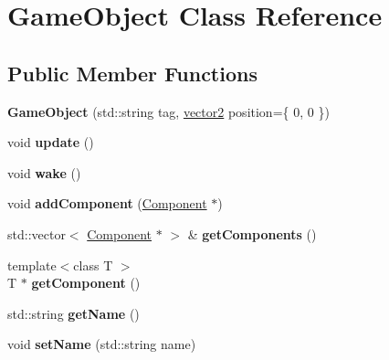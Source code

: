 \hypertarget{class_game_object}{}\section{Game\+Object Class Reference}
\label{class_game_object}
\subsection*{Public Member Functions}
\begin{DoxyCompactItemize}
\item 
\hypertarget{class_game_object_adbdcffa0cd72ae987c033e61f6b12880}{}\label{class_game_object_adbdcffa0cd72ae987c033e61f6b12880} 
{\bfseries Game\+Object} (std\+::string tag, \hyperlink{structvector2}{vector2} position=\{ 0, 0 \})
\item 
\hypertarget{class_game_object_adad7d284b670db722a2fda8e6a7997e3}{}\label{class_game_object_adad7d284b670db722a2fda8e6a7997e3} 
void {\bfseries update} ()
\item 
\hypertarget{class_game_object_ac59b76cad79c58e3ac0d4f40c4f1d4b2}{}\label{class_game_object_ac59b76cad79c58e3ac0d4f40c4f1d4b2} 
void {\bfseries wake} ()
\item 
\hypertarget{class_game_object_a0d68cf2723dd5cedc12579c08c97df04}{}\label{class_game_object_a0d68cf2723dd5cedc12579c08c97df04} 
void {\bfseries add\+Component} (\hyperlink{class_component}{Component} $\ast$)
\item 
\hypertarget{class_game_object_addbe774c69d6fb3b50acbef5f74d7319}{}\label{class_game_object_addbe774c69d6fb3b50acbef5f74d7319} 
std\+::vector$<$ \hyperlink{class_component}{Component} $\ast$ $>$ \& {\bfseries get\+Components} ()
\item 
\hypertarget{class_game_object_a1c50376c7f24439359a3962f57dfd513}{}\label{class_game_object_a1c50376c7f24439359a3962f57dfd513} 
{\footnotesize template$<$class T $>$ }\\T $\ast$ {\bfseries get\+Component} ()
\item 
\hypertarget{class_game_object_a7a7cc496716e8c8453bd0bb954f2a7ee}{}\label{class_game_object_a7a7cc496716e8c8453bd0bb954f2a7ee} 
std\+::string {\bfseries get\+Name} ()
\item 
\hypertarget{class_game_object_a58a24ffbffbcd03afa926b2c01d545fe}{}\label{class_game_object_a58a24ffbffbcd03afa926b2c01d545fe} 
void {\bfseries set\+Name} (std\+::string name)
\item 
\hypertarget{class_game_object_a4ef97dbdc30378013b28f4708cb708a0}{}\label{class_game_object_a4ef97dbdc30378013b28f4708cb708a0} 

\end{DoxyCompactItemize}
